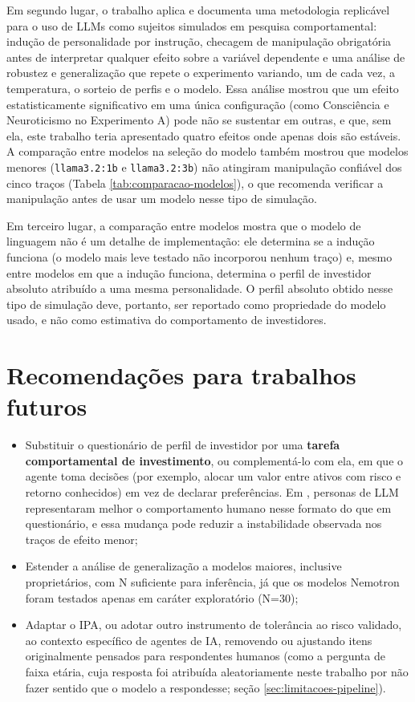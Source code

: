 Em segundo lugar, o trabalho aplica e documenta uma metodologia replicável
para o uso de LLMs como sujeitos simulados em pesquisa comportamental:
indução de personalidade por instrução, checagem de manipulação
obrigatória antes de interpretar qualquer efeito sobre a variável
dependente e uma análise de robustez e generalização que repete o
experimento variando, um de cada vez, a temperatura, o sorteio de perfis
e o modelo. Essa análise mostrou que um efeito estatisticamente
significativo em uma única configuração (como Consciência e Neuroticismo
no Experimento A) pode não se sustentar em outras, e que, sem ela, este
trabalho teria apresentado quatro efeitos onde apenas dois são estáveis.
A comparação entre modelos na seleção do modelo também mostrou que
modelos menores (\texttt{llama3.2:1b} e \texttt{llama3.2:3b}) não
atingiram manipulação confiável dos cinco traços (Tabela
\ref{tab:comparacao-modelos}), o que recomenda verificar a manipulação
antes de usar um modelo nesse tipo de simulação.

Em terceiro lugar, a comparação entre modelos mostra que o modelo de
linguagem não é um detalhe de implementação: ele determina se a indução
funciona (o modelo mais leve testado não incorporou nenhum traço) e,
mesmo entre modelos em que a indução funciona, determina o perfil de
investidor absoluto atribuído a uma mesma personalidade. O perfil
absoluto obtido nesse tipo de simulação deve, portanto, ser reportado
como propriedade do modelo usado, e não como estimativa do comportamento
de investidores.

\section{Recomendações para trabalhos futuros}

\begin{itemize}
    \item Substituir o questionário de perfil de investidor por uma
    \textbf{tarefa comportamental de investimento}, ou complementá-lo com
    ela, em que o agente toma decisões (por exemplo, alocar um valor entre
    ativos com risco e retorno conhecidos) em vez de declarar
    preferências. Em , personas de LLM
    representaram melhor o comportamento humano nesse formato do que em
    questionário, e essa mudança pode reduzir a instabilidade observada
    nos traços de efeito menor;
    \item Estender a análise de generalização a modelos maiores, inclusive
    proprietários, com N suficiente para inferência, já que os modelos
    Nemotron foram testados apenas em caráter exploratório (N=30);
    \item Adaptar o IPA, ou adotar outro instrumento de tolerância ao
    risco validado, ao contexto específico de agentes de IA, removendo ou
    ajustando itens originalmente pensados para respondentes humanos (como
    a pergunta de faixa etária, cuja resposta foi atribuída aleatoriamente
    neste trabalho por não fazer sentido que o modelo a respondesse; seção
    \ref{sec:limitacoes-pipeline}).
\end{itemize}
